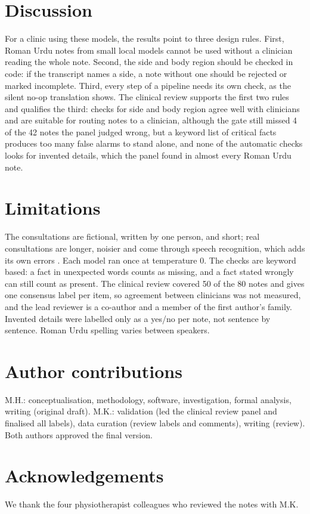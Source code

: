 \documentclass[11pt]{article}
\begin{document}
\section{Discussion}
For a clinic using these models, the results point to three design rules. First, Roman Urdu notes from small local models cannot be used without a clinician reading the whole note. Second, the side and body region should be checked in code: if the transcript names a side, a note without one should be rejected or marked incomplete. Third, every step of a pipeline needs its own check, as the silent no-op translation shows. The clinical review supports the first two rules and qualifies the third: checks for side and body region agree well with clinicians and are suitable for routing notes to a clinician, although the gate still missed 4 of the 42 notes the panel judged wrong, but a keyword list of critical facts produces too many false alarms to stand alone, and none of the automatic checks looks for invented details, which the panel found in almost every Roman Urdu note.

\section{Limitations}
The consultations are fictional, written by one person, and short; real consultations are longer, noisier and come through speech recognition, which adds its own errors \citep{radford2023whisper}. Each model ran once at temperature 0. The checks are keyword based: a fact in unexpected words counts as missing, and a fact stated wrongly can still count as present. The clinical review covered 50 of the 80 notes and gives one consensus label per item, so agreement between clinicians was not measured, and the lead reviewer is a co-author and a member of the first author's family. Invented details were labelled only as a yes/no per note, not sentence by sentence. Roman Urdu spelling varies between speakers.

\section*{Author contributions}
M.H.: conceptualisation, methodology, software, investigation, formal analysis, writing (original draft). M.K.: validation (led the clinical review panel and finalised all labels), data curation (review labels and comments), writing (review). Both authors approved the final version.

\section*{Acknowledgements}
We thank the four physiotherapist colleagues who reviewed the notes with M.K.
\end{document}

